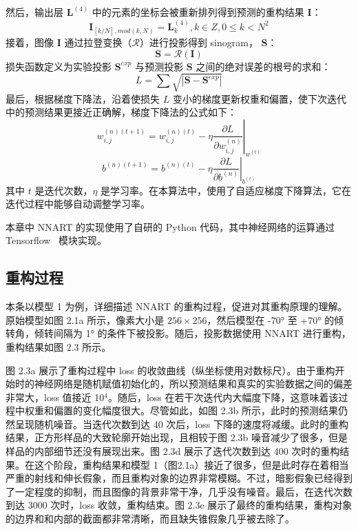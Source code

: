 然后，输出层 $\boldsymbol{L}^{(4)}$ 中的元素的坐标会被重新排列得到预测的重构结果 $\boldsymbol{I}$：
\begin{equation}
	\boldsymbol{I}_{[k/N],mod(k,N)}=\boldsymbol{L}^{(4)}_k,k\in Z,0\le k<N^2
\end{equation}
接着，图像 $\boldsymbol{I}$ 通过拉登变换（$\mathcal{R}$）进行投影得到 sinogram， $\boldsymbol{S}$：
\begin{equation}
 \boldsymbol{S}=\mathcal{R}(\boldsymbol{I})
\end{equation}
损失函数定义为实验投影 $\boldsymbol{S}^{exp}$ 与预测投影 $\boldsymbol{S}$ 之间的绝对误差的根号的求和：
\begin{equation}
L=\sum \sqrt{|\boldsymbol{S} - \boldsymbol{S}^{exp}|}
\end{equation}
最后，根据梯度下降法，沿着使损失 $L$ 变小的梯度更新权重和偏置，使下次迭代中的预测结果更接近正确解，梯度下降法的公式如下：
\begin{equation}
w^{(n)(t+1)}_{i,j}=w^{(n)(t)}_{i,j}-\eta \left.\frac{\partial L}{\partial w^{(n)}_{i,j}}\right|_{w^{(t)}}
\end{equation}
\begin{equation}
b^{(n)(t+1)}=b^{(n)(t)}-\eta \left.\frac{\partial L}{\partial b^{(n)}}\right|_{b^{(t)}}
\end{equation}
其中 $t$ 是迭代次数，$\eta$ 是学习率。在本算法中，使用了自适应梯度下降算法，它在迭代过程中能够自动调整学习率。

本章中 NNART 的实现使用了自研的 Python 代码，其中神经网络的运算通过 Tensorflow~\cite{Abadi2016} 模块实现。

\subsection{重构过程}
本条以模型 1 为例，详细描述 NNART 的重构过程，促进对其重构原理的理解。原始模型如图 2.1a 所示，像素大小是 $256\times 256$，然后模型在 -70° 至 +70° 的倾转角，倾转间隔为 1° 的条件下被投影。随后，投影数据使用 NNART 进行重构，重构结果如图 2.3 所示。

图 2.3a 展示了重构过程中 loss 的收敛曲线（纵坐标使用对数标尺）。由于重构开始时的神经网络是随机赋值初始化的，所以预测结果和真实的实验数据之间的偏差非常大，loss 值接近 10$^4$。随后，loss 在若干次迭代内大幅度下降，这意味着该过程中权重和偏置的变化幅度很大。尽管如此，如图 2.3b 所示，此时的预测结果仍然呈现随机噪音。当迭代次数到达 40 次后，loss 下降的速度将减缓。此时的重构结果，正方形样品的大致轮廓开始出现，且相较于图 2.3b 噪音减少了很多，但是样品的内部细节还没有展现出来。图 2.3d 展示了迭代次数到达 400 次时的重构结果。在这个阶段，重构结果和模型 1（图2.1a）接近了很多，但是此时存在着相当严重的射线和伸长假象，而且重构对象的边界非常模糊。不过，暗影假象已经得到了一定程度的抑制，而且图像的背景非常干净，几乎没有噪音。最后，在迭代次数到达 3000 次时，loss 收敛，重构结束。图 2.3e 展示了最终的重构结果，重构对象的边界和和内部的截面都非常清晰，而且缺失锥假象几乎被去除了。

